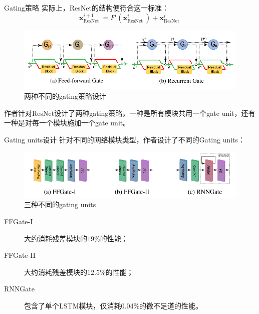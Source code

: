 \documentclass[UTF8, fontset=founder, aspectratio=43, 10pt, t]{ctexbeamer}
\begin{document}
\begin{frame}{Gating策略}
	实际上，ResNet的结构便符合这一标准：
	\begin{equation}
	\mathbf{x}_{\text {ResNet }}^{i+1}=F^{i}\left(\mathbf{x}_{\text {ResNet }}^{i}\right)+\mathbf{x}_{\text {ResNet }}^{i}
	\end{equation}
	\begin{figure}
		\centering
		\includegraphics[width=0.7\linewidth]{Images/gatingdesign}
		\caption{两种不同的gating策略设计}
		\label{fig:gatingdesign}
	\end{figure}
	作者针对ResNet设计了两种gating策略，一种是所有模块共用一个gate unit，还有一种是对每一个模块施加一个gate unit。
	
\end{frame}

\begin{frame}{Gating units设计}
	针对不同的网络模块类型，作者设计了不同的Gating units：
	\begin{figure}
		\centering
		\includegraphics[width=0.7\linewidth]{Images/gatingdesign1}
		\caption{三种不同的gating units}
		\label{fig:gatingdesign1}
	\end{figure}
	\begin{description}
		\item[FFGate-I] 大约消耗残差模块的$19\%$的性能；
		\item[FFGate-II] 大约消耗残差模块的$12.5\%$的性能；
		\item[RNNGate] 包含了单个LSTM模块，仅消耗$0.04\%$的微不足道的性能。
	\end{description}
	
\end{frame}
\end{document}
